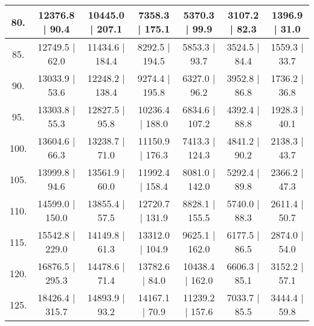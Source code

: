 \begin{tabular}{|c||c|c|c|c|c|c|}
\hline
  80. &  12376.8 |    90.4 &  10445.0 |   207.1 &   7358.3 |   175.1 &   5370.3 |    99.9 &   3107.2 |    82.3 &   1396.9 |    31.0\tabularnewline
\hline
  85. &  12749.5 |    62.0 &  11434.6 |   184.4 &   8292.5 |   194.5 &   5853.3 |    93.7 &   3524.5 |    84.4 &   1559.3 |    33.7\tabularnewline
\hline
  90. &  13033.9 |    53.6 &  12248.2 |   138.4 &   9274.4 |   195.8 &   6327.0 |    96.2 &   3952.8 |    86.8 &   1736.2 |    36.8\tabularnewline
\hline
  95. &  13303.8 |    55.3 &  12827.5 |    95.8 &  10236.4 |   188.0 &   6834.6 |   107.2 &   4392.4 |    88.8 &   1928.3 |    40.1\tabularnewline
\hline
 100. &  13604.6 |    66.3 &  13238.7 |    71.0 &  11150.9 |   176.3 &   7413.3 |   124.3 &   4841.2 |    90.2 &   2138.3 |    43.7\tabularnewline
\hline
 105. &  13999.8 |    94.6 &  13561.9 |    60.0 &  11992.4 |   158.4 &   8081.0 |   142.0 &   5292.4 |    89.8 &   2366.2 |    47.3\tabularnewline
\hline
 110. &  14599.0 |   150.0 &  13855.4 |    57.5 &  12720.7 |   131.9 &   8828.1 |   155.5 &   5740.0 |    88.3 &   2611.4 |    50.7\tabularnewline
\hline
 115. &  15542.8 |   229.0 &  14149.8 |    61.3 &  13312.0 |   104.9 &   9625.1 |   162.0 &   6177.5 |    86.5 &   2874.0 |    54.0\tabularnewline
\hline
 120. &  16876.5 |   295.3 &  14478.6 |    71.4 &  13782.6 |    84.0 &  10438.4 |   162.0 &   6606.3 |    85.1 &   3152.2 |    57.1\tabularnewline
\hline
 125. &  18426.4 |   315.7 &  14893.9 |    93.2 &  14167.1 |    70.9 &  11239.2 |   157.6 &   7033.7 |    85.5 &   3444.4 |    59.8\tabularnewline
\hline
\end{tabular}
